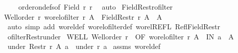\begin{isabellebody}
\ \ \ \ order{\isacharunderscore}{\kern0pt}on{\isacharunderscore}{\kern0pt}defs{\isacharbrackleft}{\kern0pt}of\ {\isachardoublequoteopen}Field\ r{\isachardoublequoteclose}\ r{\isacharbrackright}{\kern0pt}\ \isamarkupfalse%
\ auto%
\endisatagproof
{\isafoldproof}%
%
\isadelimproof
%
\endisadelimproof
%
\isadelimdocument
%
\endisadelimdocument
%
\isatagdocument
%
\isamarkuptrue%
%
\endisatagdocument
{\isafolddocument}%
%
\isadelimdocument
%
\endisadelimdocument
{}\isamarkupfalse%
\ Field{\isacharunderscore}{\kern0pt}Restr{\isacharunderscore}{\kern0pt}ofilter{\isacharcolon}{\kern0pt}\isanewline
{\isachardoublequoteopen}{\isasymlbrakk}Well{\isacharunderscore}{\kern0pt}order\ r{\isacharsemicolon}{\kern0pt}\ wo{\isacharunderscore}{\kern0pt}rel{\isachardot}{\kern0pt}ofilter\ r\ A{\isasymrbrakk}\ {\isasymLongrightarrow}\ Field{\isacharparenleft}{\kern0pt}Restr\ r\ A{\isacharparenright}{\kern0pt}\ {\isacharequal}{\kern0pt}\ A{\isachardoublequoteclose}\isanewline
%
\isadelimproof
%
\endisadelimproof
%
\isatagproof
{}\isamarkupfalse%
\ {\isacharparenleft}{\kern0pt}auto\ simp\ add{\isacharcolon}{\kern0pt}\ wo{\isacharunderscore}{\kern0pt}rel{\isacharunderscore}{\kern0pt}def\ wo{\isacharunderscore}{\kern0pt}rel{\isachardot}{\kern0pt}ofilter{\isacharunderscore}{\kern0pt}def\ wo{\isacharunderscore}{\kern0pt}rel{\isachardot}{\kern0pt}REFL\ Refl{\isacharunderscore}{\kern0pt}Field{\isacharunderscore}{\kern0pt}Restr{}{\isacharparenright}{\kern0pt}%
\endisatagproof
{\isafoldproof}%
%
\isadelimproof
\isanewline
%
\endisadelimproof
\isanewline
{}\isamarkupfalse%
\ ofilter{\isacharunderscore}{\kern0pt}Restr{\isacharunderscore}{\kern0pt}under{\isacharcolon}{\kern0pt}\isanewline
{}\ WELL{\isacharcolon}{\kern0pt}\ {\isachardoublequoteopen}Well{\isacharunderscore}{\kern0pt}order\ r{\isachardoublequoteclose}\ \ OF{\isacharcolon}{\kern0pt}\ {\isachardoublequoteopen}wo{\isacharunderscore}{\kern0pt}rel{\isachardot}{\kern0pt}ofilter\ r\ A{\isachardoublequoteclose}\ \ IN{\isacharcolon}{\kern0pt}\ {\isachardoublequoteopen}a\ {\isasymin}\ A{\isachardoublequoteclose}\isanewline
{}\ {\isachardoublequoteopen}under\ {\isacharparenleft}{\kern0pt}Restr\ r\ A{\isacharparenright}{\kern0pt}\ a\ {\isacharequal}{\kern0pt}\ under\ r\ a{\isachardoublequoteclose}\isanewline
%
\isadelimproof
%
\endisadelimproof
%
\isatagproof
{}\isamarkupfalse%
\ assms\ wo{\isacharunderscore}{\kern0pt}rel{\isacharunderscore}{\kern0pt}def\isanewline

\end{isabellebody}
